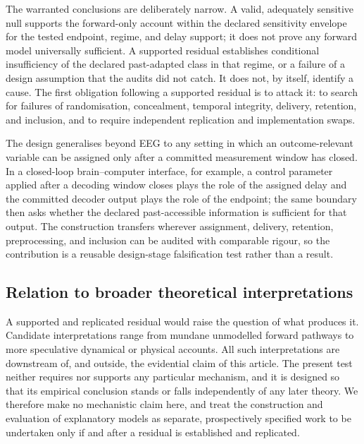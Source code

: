 \documentclass[11pt,a4paper]{article}
\theoremstyle{definition}
\begin{document}
The warranted conclusions are deliberately narrow. A valid, adequately sensitive
null supports the forward-only account within the
declared sensitivity envelope for the tested endpoint, regime, and delay support; it
does not prove any forward model universally sufficient. A supported residual
establishes conditional insufficiency of the declared past-adapted class in that
regime, or a failure of a design assumption that the audits did not catch. It
does not, by itself, identify a cause. The first obligation following a supported
residual is to attack it: to search for failures of randomisation, concealment,
temporal integrity, delivery, retention, and inclusion, and to require
independent replication and implementation swaps.

The design generalises beyond EEG to any setting in which an outcome-relevant
variable can be assigned only after a committed measurement window has closed. In
a closed-loop brain--computer interface, for example, a control parameter applied
after a decoding window closes plays the role of the assigned delay and the
committed decoder output plays the role of the endpoint; the same boundary then
asks whether the declared past-accessible information is sufficient for that
output. The construction transfers wherever assignment, delivery, retention,
preprocessing, and inclusion can be audited with comparable rigour, so the
contribution is a reusable design-stage falsification test rather than a result.

\subsection{Relation to broader theoretical interpretations}
\label{sec:broader}

A supported and replicated residual would raise the question of what produces it.
Candidate interpretations range from mundane unmodelled forward pathways to more
speculative dynamical or physical accounts. All such interpretations are
downstream of, and outside, the evidential claim of this article. The present
test neither requires nor supports any particular mechanism, and it is designed
so that its empirical conclusion stands or falls independently of any later
theory. We therefore make no mechanistic claim here, and treat the construction
and evaluation of explanatory models as separate, prospectively specified work to
be undertaken only if and after a residual is established and replicated.

\end{document}
